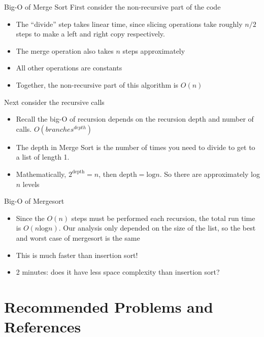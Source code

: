 \documentclass[
  ignorenonframetext,
]{beamer}
\begin{document}
\begin{frame}{Big-O of Merge Sort}
\protect\hypertarget{big-o-of-merge-sort}{}
First consider the non-recursive part of the code

\begin{itemize}
\item
  The ``divide'' step takes linear time, since slicing operations take
  roughly \(n/2\) steps to make a left and right copy respectively.
\item
  The merge operation also takes \(n\) steps approximately
\item
  All other operations are constants
\item
  Together, the non-recursive part of this algorithm is \(O(n)\)
\end{itemize}

Next consider the recursive calls

\begin{itemize}
\item
  Recall the big-O of recursion depends on the recursion depth and
  number of calls. \(O(branches^{depth})\)
\item
  The depth in Merge Sort is the number of times you need to divide to
  get to a list of length 1.
\item
  Mathematically, \(2^{\text{depth}} = n\), then
  \(\text{depth} = \text{log}n\). So there are approximately log \(n\)
  levels
\end{itemize}
\end{frame}

\begin{frame}{Big-O of Mergesort}
\protect\hypertarget{big-o-of-mergesort}{}
\begin{itemize}
\item
  Since the \(O(n)\) steps must be performed each recursion, the total
  run time is \(O(n\text{log}n)\). Our analysis only depended on the
  size of the list, so the best and worst case of mergesort is the same
\item
  This is much faster than insertion sort!
\item
  2 minutes: does it have less space complexity than insertion sort?
\end{itemize}
\end{frame}

\hypertarget{recommended-problems-and-references}{%
\section{Recommended Problems and
References}\label{recommended-problems-and-references}}
\end{document}
